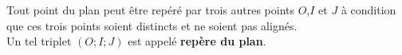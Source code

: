 Tout point du plan peut être repéré par trois autres points $O$,$I$ et $J$ à condition que ces trois points soient distincts et ne soient pas alignés. \\
Un tel \og triplet \fg{} $\left(O;I;J\right)$ est appelé \textbf{repère du plan}.



